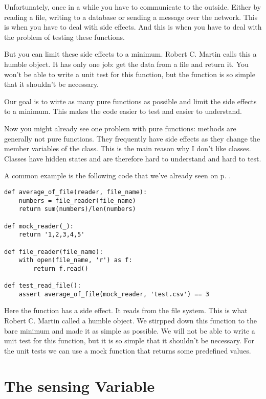 Unfortunately, once in a while you have to communicate to the outside. Either by reading a file, writing to a database or sending a message over the network. This is when you have to deal with side effects. And this is when you have to deal with the problem of testing these functions.

But you can limit these side effects to a minimum. Robert C. Martin calls this a humble object. It has only one job: get the data from a file and return it. You won't be able to write a unit test for this function, but the function is so simple that it shouldn't be necessary.

Our goal is to wirte as many pure functions as possible and limit the side effects to a minimum. This makes the code easier to test and easier to understand.

Now you might already see one problem with pure functions: methods are generally not pure functions. They frequently have side effects as they change the member variables of the class. This is the main reason why I don't like classes. Classes have hidden states and are therefore hard to understand and hard to test.

A common example is the following code that we've already seen on p. \pageref{prog:average_of_file}.

\begin{programcode}{}\label{prog:mock_reader}
\begin{verbatim}
def average_of_file(reader, file_name):
    numbers = file_reader(file_name)
    return sum(numbers)/len(numbers)

def mock_reader(_):
    return '1,2,3,4,5'

def file_reader(file_name):
    with open(file_name, 'r') as f:
        return f.read()

def test_read_file():
    assert average_of_file(mock_reader, 'test.csv') == 3
\end{verbatim}
\end{programcode}

Here the function  has a side effect. It reads from the file system. This is what Robert C. Martin called a humble object. We stirpped down this function to the bare minimum and made it as simple as possible. We will not be able to write a unit test for this function, but it is so simple that it shouldn't be necessary. For the unit tests we can use a mock function that returns some predefined values.

\section{The sensing Variable}

